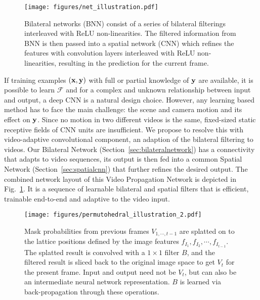 \begin{figure*}[t!]
\begin{center}
\centerline{\texttt{[image: figures/net\_illustration.pdf]}}
   {Bilateral networks (BNN) consist of a series of bilateral filterings interleaved with ReLU non-linearities. The filtered information from BNN is then passed into a spatial network (CNN) which refines the features with convolution layers interleaved with ReLU
  non-linearities, resulting in the prediction for the current frame.}
  \label{fig:net_illustration}
\end{center}
\end{figure*}


If training examples $(\mathbf{x},\mathbf{y})$ with full or partial knowledge of $\mathbf{y}$ are available, it is possible to learn $\mathcal{F}$ and for a complex and unknown relationship between input and output, a deep CNN is a natural design
choice. However, any learning based method has to face the main challenge: the scene and camera motion and its
effect on $\mathbf{y}$. Since no motion in two different videos is the same, fixed-sized static receptive fields of CNN units are insufficient.
We propose to resolve this with video-adaptive convolutional component, an adaption of the bilateral filtering to videos.
Our Bilateral Network (Section~\ref{sec:bilateralnetwork}) has a connectivity that adapts to video sequences, its output is then fed into a common Spatial Network (Section~\ref{sec:spatialcnn}) that further refines the desired output.
The combined network layout of this Video Propagation Network is depicted in Fig.~\ref{fig:net_illustration}.
It is a sequence of learnable bilateral and spatial filters that is efficient, trainable end-to-end and adaptive to the video input.

\begin{figure*}[t!]
\begin{center}
  \centerline{\texttt{[image: figures/permutohedral\_illustration\_2.pdf]}}
    {Mask probabilities from previous frames $V_{1,\cdots,t-1}$ are splatted on to the
    lattice positions defined by the image features $f_{I_{1}},f_{I_2},\cdots,f_{I_{t-1}}$.
    The splatted result is convolved with a $1 \times 1$ filter $B$, and the filtered
    result is sliced back to the original image space to get $V_t$ for the present frame.
    Input and output need not be $V_t$, but can also be an intermediate neural network representation.
    $B$ is learned via back-propagation through these operations.}
    \label{fig:filter_illustration}
\end{center}
\end{figure*}

